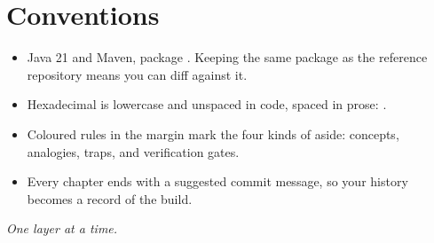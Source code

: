 \section*{Conventions}

\begin{itemize}
  \item Java 21 and Maven, package . Keeping the same
        package as the reference repository means you can diff against it.
  \item Hexadecimal is lowercase and unspaced in code, spaced in prose:
        .
  \item Coloured rules in the margin mark the four kinds of aside:
        \textcolor{brewerblue}{concepts}, \textcolor{breweramber}{analogies},
        \textcolor{brewerred}{traps}, and \textcolor{brewergreen}{verification
        gates}.
  \item Every chapter ends with a suggested commit message, so your history
        becomes a record of the build.
\end{itemize}

\vspace{1em}
\begin{flushright}
\itshape One layer at a time.
\end{flushright}
